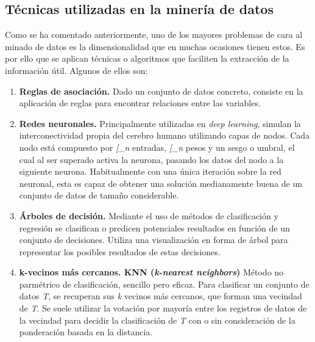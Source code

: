\subsection{Técnicas utilizadas en la minería de datos}
Como se ha comentado anteriormente, uno de los mayores problemas de cara al minado de datos es la dimensionalidad que en muchas ocasiones tienen estos. Es por ello que se aplican técnicas o algoritmos que faciliten la extracción de la información útil. Algunos de ellos son:
\begin{enumerate}
	\item \textbf{Reglas de asociación.} Dado un conjunto de datos concreto, consiste en la aplicación de reglas para encontrar relaciones entre las variables.
	\item \textbf{Redes neuronales.} Principalmente utilizadas en \textit{deep learning}, simulan la interconectividad propia del cerebro humano utilizando capas de nodos. Cada nodo está compuesto por \textit{[\x_n\]} entradas, \textit{[\w_n\]} pesos y un sesgo o umbral, el cual al ser superado activa la neurona, pasando los datos del nodo a la siguiente neurona. Habitualmente con una única iteración sobre la red neuronal, esta es capaz de obtener una solución medianamente buena de un conjunto de datos de tamaño considerable. \cite{CRAVEN1997211}
	\item \textbf{Árboles de decisión.} Mediante el uso de métodos de clasificación y regresión se clasifican o predicen potenciales resultados en función de un conjunto de decisiones. Utiliza una visualización en forma de árbol para representar los posibles resultados de estas decisiones.
	\item \textbf{k-vecinos más cercanos. KNN (\textit{k-nearest neighbors})} Método no parmétrico de clasificación, sencillo pero eficaz.\cite{hand2007principles} Para clasificar un conjunto de datos \textit{T}, se recuperan sus \textit{k} vecinos más cercanos, que forman una vecindad de \textit{T}. Se suele utilizar la votación por mayoría entre los registros de datos de la vecindad para decidir la clasificación de \textit{T} con o sin consideración de la ponderación basada en la distancia.\cite{guo2003knn}
\end{enumerate}